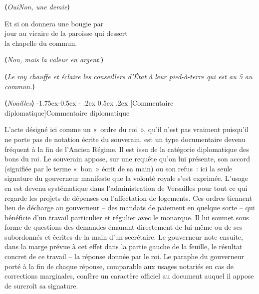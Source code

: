 \documentclass[11pt,twoside]{article}\makeatletter
\makeatletter
\def\reg{}
\renewcommand\subsection{\@startsection{subsection}{2}{\z@}%
     {-1.75ex\@plus -0.5ex \@minus- .2ex}%
     {0.5ex \@plus .2ex}%
     {\reset@font\Large\sffamily}}
\makeatother
\begin{document}
⟨\textit{OuiNon, une demie}⟩\par
Et si on donnera une bougie par {\hskip1pt}\\{}jour au vicaire de la  {\reg paroisse} qui dessert {\hskip1pt}\\{}la chapelle du commun\hyperref[n-010]{}.\par
⟨\textit{Non, mais la valeur en argent.}⟩\par
⟨\textit{Le roy chauffe et éclaire les conseillers d’État à leur pied-à-terre qui est au 5 au commun.}⟩\par
⟨\textit{Noailles}⟩
\subsection[{Commentaire diplomatique}]{Commentaire diplomatique}\par
L’acte désigné ici comme un « ordre du roi », qu’il n’est pas vraiment puisqu’il ne porte pas de notation écrite du souverain, est un type documentaire devenu fréquent à la fin de l’Ancien Régime. Il est issu de la catégorie diplomatique des bons du roi. Le souverain appose, sur une requête qu’on lui présente, son accord (signifiée par le terme « bon » écrit de sa main) ou son refus : ici la seule signature du gouverneur manifeste que la volonté royale s’est exprimée. L’usage en est devenu systématique dans l’administration de Versailles pour tout ce qui regarde les projets de dépenses ou l’affectation de logements. Ces ordres tiennent lieu de décharge au gouverneur – des mandats de paiement en quelque sorte – qui bénéficie d’un travail particulier et régulier avec le monarque. Il lui soumet sous forme de questions des demandes émanant directement de lui-même ou de ses subordonnés et écrites de la main d’un secrétaire. Le gouverneur note ensuite, dans la marge prévue à cet effet dans la partie gauche de la feuille, le résultat concret de ce travail – la réponse donnée par le roi. Le paraphe du gouverneur porté à la fin de chaque réponse, comparable aux usages notariés en cas de corrections marginales, confère un caractère officiel au document auquel il appose de surcroît sa signature.
\end{document}
